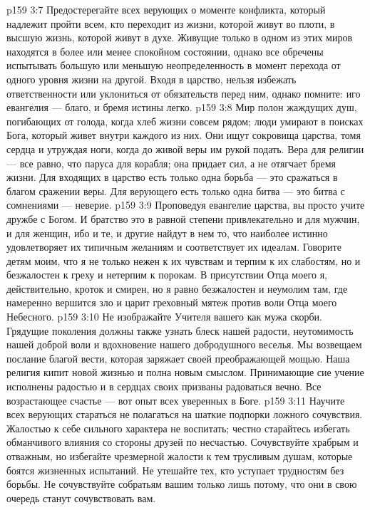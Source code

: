 \vs p159 3:7 Предостерегайте всех верующих о моменте конфликта, который надлежит пройти всем, кто переходит из жизни, которой живут во плоти, в высшую жизнь, которой живут в духе. Живущие только в одном из этих миров находятся в более или менее спокойном состоянии, однако все обречены испытывать большую или меньшую неопределенность в момент перехода от одного уровня жизни на другой. Входя в царство, нельзя избежать ответственности или уклониться от обязательств перед ним, однако помните: иго евангелия --- благо, и бремя истины легко.
\vs p159 3:8 Мир полон жаждущих душ, погибающих от голода, когда хлеб жизни совсем рядом; люди умирают в поисках Бога, который живет внутри каждого из них. Они ищут сокровища царства, томя сердца и утруждая ноги, когда до живой веры им рукой подать. Вера для религии --- все равно, что паруса для корабля; она придает сил, а не отягчает бремя жизни. Для входящих в царство есть только одна борьба --- это сражаться в благом сражении веры. Для верующего есть только одна битва --- это битва с сомнениями --- неверие.
\vs p159 3:9 Проповедуя евангелие царства, вы просто учите дружбе с Богом. И братство это в равной степени привлекательно и для мужчин, и для женщин, ибо и те, и другие найдут в нем то, что наиболее истинно удовлетворяет их типичным желаниям и соответствует их идеалам. Говорите детям моим, что я не только нежен к их чувствам и терпим к их слабостям, но и безжалостен к греху и нетерпим к порокам. В присутствии Отца моего я, действительно, кроток и смирен, но я равно безжалостен и неумолим там, где намеренно вершится зло и царит греховный мятеж против воли Отца моего Небесного.
\vs p159 3:10 Не изображайте Учителя вашего как мужа скорби. Грядущие поколения должны также узнать блеск нашей радости, неутомимость нашей доброй воли и вдохновение нашего добродушного веселья. Мы возвещаем послание благой вести, которая заряжает своей преображающей мощью. Наша религия кипит новой жизнью и полна новым смыслом. Принимающие сие учение исполнены радостью и в сердцах своих призваны радоваться вечно. Все возрастающее счастье --- вот опыт всех уверенных в Боге.
\vs p159 3:11 Научите всех верующих стараться не полагаться на шаткие подпорки ложного сочувствия. Жалостью к себе сильного характера не воспитать; честно старайтесь избегать обманчивого влияния со стороны друзей по несчастью. Сочувствуйте храбрым и отважным, но избегайте чрезмерной жалости к тем трусливым душам, которые боятся жизненных испытаний. Не утешайте тех, кто уступает трудностям без борьбы. Не сочувствуйте собратьям вашим только лишь потому, что они в свою очередь станут сочувствовать вам.
